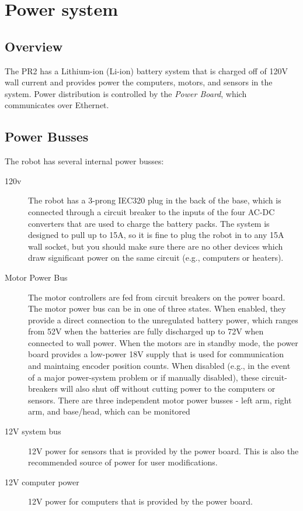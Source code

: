 \section{Power system}
\subsection{Overview}
The PR2 has a Lithium-ion (Li-ion) battery system that is charged off of 120V wall current and provides power the computers, motors, and sensors in the system.  Power distribution is controlled by the {\it Power Board}, which communicates over Ethernet.
\subsection{Power Busses}
The robot has several internal power busses:
\begin{description}
\item[120v] The robot has a 3-prong IEC320 plug in the back of the base, which is connected through a circuit breaker to the inputs of the four AC-DC converters that are used to charge the battery packs.  The system is designed to pull up to 15A, so it is fine to plug the robot in to any 15A wall socket, but you should make sure there are no other devices which draw significant power on the same circuit (e.g., computers or heaters).
\item[Motor Power Bus] The motor controllers are fed from circuit breakers on the power board. The motor power bus can be in one of three states.  When enabled, they provide a direct connection to the unregulated battery power, which ranges from 52V when the batteries are fully discharged up to 72V when connected to wall power.  When the motors are in standby mode, the power board provides a low-power 18V supply that is used for communication and maintaing encoder position counts.  When disabled (e.g., in the event of a major power-system problem or if manually disabled), these circuit-breakers will also shut off without cutting power to the computers or sensors.  There are three independent motor power busses - left arm, right arm, and base/head, which can be monitored 
\item[12V system bus]
12V power for sensors that is provided by the power board.  This is also the recommended source of power for user modifications.
\item[12V computer power]
12V power for computers that is provided by the power board.
\end{description}
